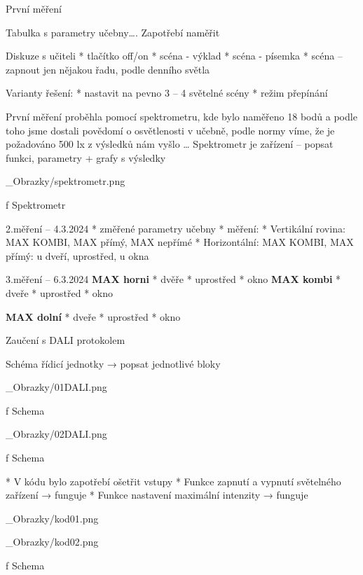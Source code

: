 \sec První měření

Tabulka s parametry učebny…. Zapotřebí naměřit
\medskip

Diskuze s učiteli 
\begitems
    * tlačítko off/on
    * scéna - výklad
    * scéna - písemka
    * scéna – zapnout jen nějakou řadu, podle denního světla
\enditems

\begitems
Varianty řešení:
    * nastavit na pevno 3 – 4 světelné scény
    * režim přepínání 
\enditems

\medskip
První měření proběhla pomocí spektrometru, kde bylo naměřeno 18 bodů a podle toho jsme dostali povědomí o osvětlenosti v učebně, podle normy víme, že je požadováno 500 lx z výsledků nám vyšlo …
Spektrometr je zařízení – popsat funkci, parametry + grafy s výsledky

\medskip {}
\picw=5cm _Obrazky/spektrometr.png
\caption/f Spektrometr
\medskip

\sec 2.měření – 4.3.2024
\begitems
    * změřené parametry učebny
    * měření:
    * Vertikální rovina: MAX KOMBI, MAX přímý, MAX nepřímé
    * Horizontální: MAX KOMBI, MAX přímý: u dveří, uprostřed, u okna
\enditems

\sec 3.měření – 6.3.2024
{\bf MAX horni}
\begitems
    * dvěře
    * uprostřed
    * okno
\enditems
\medskip
\begitems
{\bf MAX kombi}
    * dveře
    * uprostřed
    * okno
\enditems
\medskip

\begitems
{\bf MAX dolní}
    * dveře
    * uprostřed
    * okno
\enditems

\sec Zaučení s DALI protokolem

Schéma řídicí jednotky → popsat jednotlivé bloky

\medskip
\picw=12cm _Obrazky/01DALI.png
\caption/f Schema
\medskip

\medskip
\picw=13cm _Obrazky/02DALI.png
\caption/f Schema
\medskip

\begitems
    * V kódu bylo zapotřebí ošetřit vstupy 
    * Funkce zapnutí a vypnutí světelného zařízení → funguje
    * Funkce nastavení maximální intenzity → funguje
\enditems

\medskip 
\picw=15cm _Obrazky/kod01.png
\medskip

\medskip
\picw=15cm _Obrazky/kod02.png
\caption/f Schema
\medskip